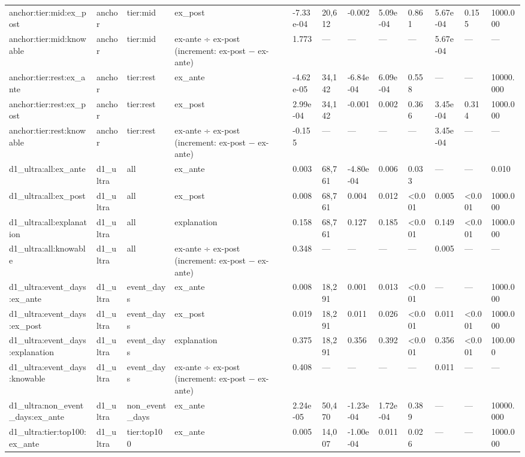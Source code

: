 \begin{tabular}{llllllllllll}
anchor:tier:mid:ex\_post & anchor & tier:mid & ex\_post & -7.33e-04 & 20,612 & -0.002 & 5.09e-04 & 0.861 & 5.67e-04 & 0.155 & 1000.000 \\
anchor:tier:mid:knowable & anchor & tier:mid & ex-ante ÷ ex-post (increment: ex-post − ex-ante) & 1.773 & — & — & — & — & 5.67e-04 & — & — \\
anchor:tier:rest:ex\_ante & anchor & tier:rest & ex\_ante & -4.62e-05 & 34,142 & -6.84e-04 & 6.09e-04 & 0.558 & — & — & 10000.000 \\
anchor:tier:rest:ex\_post & anchor & tier:rest & ex\_post & 2.99e-04 & 34,142 & -0.001 & 0.002 & 0.366 & 3.45e-04 & 0.314 & 1000.000 \\
anchor:tier:rest:knowable & anchor & tier:rest & ex-ante ÷ ex-post (increment: ex-post − ex-ante) & -0.155 & — & — & — & — & 3.45e-04 & — & — \\
d1\_ultra:all:ex\_ante & d1\_ultra & all & ex\_ante & 0.003 & 68,761 & -4.80e-04 & 0.006 & 0.033 & — & — & 0.010 \\
d1\_ultra:all:ex\_post & d1\_ultra & all & ex\_post & 0.008 & 68,761 & 0.004 & 0.012 & <0.001 & 0.005 & <0.001 & 1000.000 \\
d1\_ultra:all:explanation & d1\_ultra & all & explanation & 0.158 & 68,761 & 0.127 & 0.185 & <0.001 & 0.149 & <0.001 & 1000.000 \\
d1\_ultra:all:knowable & d1\_ultra & all & ex-ante ÷ ex-post (increment: ex-post − ex-ante) & 0.348 & — & — & — & — & 0.005 & — & — \\
d1\_ultra:event\_days:ex\_ante & d1\_ultra & event\_days & ex\_ante & 0.008 & 18,291 & 0.001 & 0.013 & <0.001 & — & — & 1000.000 \\
d1\_ultra:event\_days:ex\_post & d1\_ultra & event\_days & ex\_post & 0.019 & 18,291 & 0.011 & 0.026 & <0.001 & 0.011 & <0.001 & 1000.000 \\
d1\_ultra:event\_days:explanation & d1\_ultra & event\_days & explanation & 0.375 & 18,291 & 0.356 & 0.392 & <0.001 & 0.356 & <0.001 & 100.000 \\
d1\_ultra:event\_days:knowable & d1\_ultra & event\_days & ex-ante ÷ ex-post (increment: ex-post − ex-ante) & 0.408 & — & — & — & — & 0.011 & — & — \\
d1\_ultra:non\_event\_days:ex\_ante & d1\_ultra & non\_event\_days & ex\_ante & 2.24e-05 & 50,470 & -1.23e-04 & 1.72e-04 & 0.389 & — & — & 10000.000 \\
d1\_ultra:tier:top100:ex\_ante & d1\_ultra & tier:top100 & ex\_ante & 0.005 & 14,007 & -1.00e-04 & 0.011 & 0.026 & — & — & 1000.000 \\

\end{tabular}
